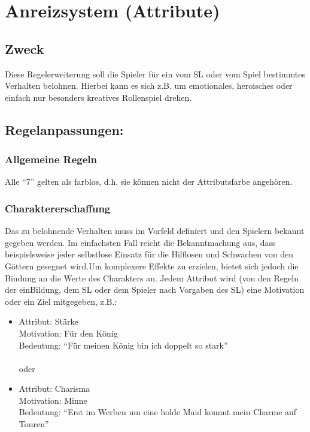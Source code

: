 \section{Anreizsystem (Attribute)}
\subsection{Zweck}
Diese Regelerweiterung soll die Spieler für ein vom SL oder vom Spiel bestimmtes Verhalten belohnen. Hierbei kann es sich z.B. um emotionales, heroisches oder einfach nur besonders kreatives Rollenspiel drehen.

\subsection{Regelanpassungen:}
\subsubsection{Allgemeine Regeln}
Alle "`7"' gelten als farblos, d.h. sie können nicht der Attributsfarbe angehören.
\subsubsection{Charaktererschaffung}
Das zu belohnende Verhalten muss im Vorfeld definiert und den Spielern bekannt gegeben werden. Im einfachsten Fall reicht die Bekanntmachung aus, dass beispielsweise jeder selbstlose Einsatz für die Hilflosen und Schwachen von den Göttern gesegnet wird.Um komplexere Effekte zu erzielen, bietet sich jedoch die Bindung an die Werte des Charakters an. Jedem Attribut wird (von den Regeln der einBildung, dem SL oder dem Spieler nach Vorgaben des SL) eine Motivation oder ein Ziel mitgegeben, z.B.:
\begin{itemize}
\item Attribut: Stärke\\
Motivation: Für den König\\
Bedeutung: "`Für meinen König bin ich doppelt so stark"'\\
\\
      oder
\item Attribut: Charisma\\
Motivation: Minne\\
Bedeutung: "`Erst im Werben um eine holde Maid kommt mein Charme auf Touren"'
\end{itemize}
